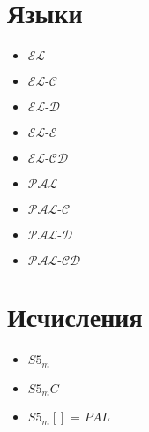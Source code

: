 \documentclass[11pt]{article}
\newcommand{\EL}{\mathcal{EL}}
\newcommand{\ELC}{\mathcal{EL\text{-}C}}
\newcommand{\ELD}{\mathcal{EL\text{-}D}}
\newcommand{\ELCD}{\mathcal{EL\text{-}CD}}
\newcommand{\ELE}{\mathcal{EL\text{-}E}}
\newcommand{\PAL}{\mathcal{PAL}}
\newcommand{\PALC}{\mathcal{PAL\text{-}C}}
\newcommand{\PALD}{\mathcal{PAL\text{-}D}}
\newcommand{\PALCD}{\mathcal{PAL\text{-}CD}}
\newcommand{\ELC}{\mathcal{EL\text{-}RC}}
\begin{document}
\section{Языки}
\begin{itemize}
	\item $\EL$
	\item $\ELC$
	\item $\ELD$
	\item $\ELE$
	\item $\ELCD$
	\item $\PAL$
	\item $\PALC$
	\item $\PALD$
	\item $\PALCD$
\end{itemize}

\section{Исчисления}
\begin{itemize}
\item $S5_m$
\item $S5_mC$		
\item $S5_m[]$ = $PAL$	

\end{itemize}
\end{document}
